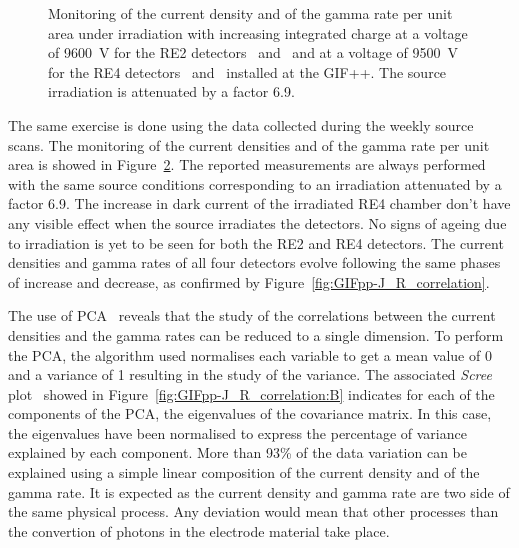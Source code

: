 \begin{figure}[H]
\begin{subfigure}{0.5\linewidth}
        	\caption{\label{fig:GIFpp-Source-mon:D}}
    	\end{subfigure}
		\caption{\label{fig:GIFpp-Source-mon} Monitoring of the current density and of the gamma rate per unit area under irradiation with increasing integrated charge at a voltage of \SI{9600}{V} for the RE2 detectors~ and~ and at a voltage of \SI{9500}{V} for the RE4 detectors~ and~ installed at the GIF++. The source irradiation is attenuated by a factor 6.9.}
	\end{figure}
	
	The same exercise is done using the data collected during the weekly source scans. The monitoring of the current densities and of the gamma rate per unit area is showed in Figure~\ref{fig:GIFpp-Source-mon}. The reported measurements are always performed with the same source conditions corresponding to an irradiation attenuated by a factor 6.9. The increase in dark current of the irradiated RE4 chamber don't have any visible effect when the source irradiates the detectors. No signs of ageing due to irradiation is yet to be seen for both the RE2 and RE4 detectors. The current densities and gamma rates of all four detectors evolve following the same phases of increase and decrease, as confirmed by Figure~\ref{fig:GIFpp-J_R_correlation}.
	
	The use of \acf{PCA}~\cite{PCA} reveals that the study of the correlations between the current densities and the gamma rates can be reduced to a single dimension. To perform the PCA, the algorithm used normalises each variable to get a mean value of 0 and a variance of 1 resulting in the study of the variance. The associated \textit{Scree} plot~\cite{SCREE} showed in Figure~\ref{fig:GIFpp-J_R_correlation:B} indicates for each of the components of the PCA, the eigenvalues of the covariance matrix. In this case, the eigenvalues have been normalised to express the percentage of variance explained by each component. More than 93\% of the data variation can be explained using a simple linear composition of the current density and of the gamma rate. It is expected as the current density and gamma rate are two side of the same physical process. Any deviation would mean that other processes than the convertion of photons in the electrode material take place.

